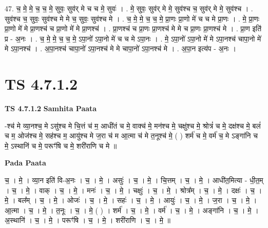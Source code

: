 \documentclass[17pt]{extarticle}
\begin{document}
47. च॒ मे॒ मे॒ च॒ च॒ मे॒ सुवः॒ सुव॑र् मे च च मे॒ सुवः॑ । . मे॒ सुवः॒ सुव॑र् मे मे॒ सुव॑श्च च॒ सुव॑र् मे मे॒ सुव॑श्च । . सुव॑श्च च॒ सुवः॒ सुव॑श्च मे मे च॒ सुवः॒ सुव॑श्च मे । . च॒ मे॒ मे॒ च॒ च॒ मे॒ प्रा॒णः प्रा॒णो मे॑ च च मे प्रा॒णः । . मे॒ प्रा॒णः प्रा॒णो मे॑ मे प्रा॒णश्च॑ च प्रा॒णो मे॑ मे प्रा॒णश्च॑ । . प्रा॒णश्च॑ च प्रा॒णः प्रा॒णश्च॑ मे मे च प्रा॒णः प्रा॒णश्च॑ मे । . प्रा॒ण इति॑ प्र - अ॒नः । . च॒ मे॒ मे॒ च॒ च॒ मे॒ ऽपा॒नो॑ ऽपा॒नो मे॑ च च मे ऽपा॒नः । . मे॒ ऽपा॒नो॑ ऽपा॒नो मे॑ मे ऽपा॒नश्च॑ चापा॒नो मे॑ मे ऽपा॒नश्च॑ । . अ॒पा॒नश्च॑ चापा॒नो॑ ऽपा॒नश्च॑ मे मे चापा॒नो॑ ऽपा॒नश्च॑ मे । . अ॒पा॒न इत्य॑प - अ॒नः । \newline
\pagebreak
{}

\section{ TS 4.7.1.2 }

\textbf{TS 4.7.1.2 } \newline
\textbf{Samhita Paata} \newline

-श्च॑ मे व्या॒नश्च॒ मे ऽसु॑श्च मे चि॒त्तं च॑ म॒ आधी॑तं च मे॒ वाक्च॑ मे॒ मन॑श्च मे॒ चक्षु॑श्च मे॒ श्रोत्रं॑ च मे॒ दक्ष॑श्च मे॒ बलं॑ च म॒ ओज॑श्च मे॒ सह॑श्च म॒ आयु॑श्च मे ज॒रा च॑ म आ॒त्मा च॑ मे त॒नूश्च॑ मे॒ ( ) शर्म॑ च मे॒ वर्म॑ च॒ मे ऽङ्गा॑नि च मे॒ ऽस्थानि॑ च मे॒ परूꣳ॑षि च मे॒ शरी॑राणि च मे ॥ \newline

\textbf{Pada Paata} \newline

च॒ । मे॒ । व्या॒न इति॑ वि-अ॒नः । च॒ । मे॒ । असुः॑ । च॒ । मे॒ । चि॒त्तम् । च॒ । मे॒ । आधी॑त॒मित्या - धी॒त॒म् । च॒ । मे॒ । वाक् । च॒ । मे॒ । मनः॑ । च॒ । मे॒ । चक्षुः॑ । च॒ । मे॒ । श्रोत्र᳚म् । च॒ । मे॒ । दक्षः॑ । च॒ । मे॒ । बल᳚म् । च॒ । मे॒ । ओजः॑ । च॒ । मे॒ । सहः॑ । च॒ । मे॒ । आयुः॑ । च॒ । मे॒ । ज॒रा । च॒ । मे॒ । आ॒त्मा । च॒ । मे॒ । त॒नूः । च॒ । मे॒ ( ) । शर्म॑ । च॒ । मे॒ । वर्म॑ । च॒ । मे॒ । अङ्गा॑नि । च॒ । मे॒ । अ॒स्थानि॑ । च॒ । मे॒ । परूꣳ॑षि । च॒ । मे॒ । शरी॑राणि । च॒ । मे॒ ॥  \newline
\end{document}
